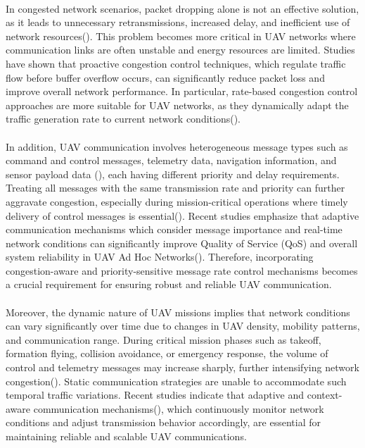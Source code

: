 \documentclass[pdflatex,sn-mathphys-num]{sn-jnl}%
\theoremstyle{thmstyleone}%
\theoremstyle{thmstyletwo}%
\theoremstyle{thmstylethree}%
\begin{document}
\\
In congested network scenarios, packet dropping alone is not an effective solution, as it leads to unnecessary retransmissions, increased delay, and inefficient use of network resources(\citet{anwekar2023analysis}). This problem becomes more critical in UAV networks where communication links are often unstable and energy resources are limited. Studies have shown that proactive congestion control techniques, which regulate traffic flow before buffer overflow occurs, can significantly reduce packet loss and improve overall network performance. In particular, rate-based congestion control approaches are more suitable for UAV networks, as they dynamically adapt the traffic generation rate to current network conditions(\citet{verma2024adaptive}).\\
\\
 In addition, UAV communication involves heterogeneous message types such as command and control messages, telemetry data, navigation information, and sensor payload data (\citet{cordill2025comprehensive}), each having different priority and delay requirements. Treating all messages with the same transmission rate and priority can further aggravate congestion, especially during mission-critical operations where timely delivery of control messages is essential(\citet{ribeiro2021communication}). Recent studies emphasize that adaptive communication mechanisms which consider message importance and real-time network conditions can significantly improve Quality of Service (QoS) and overall system reliability in UAV Ad Hoc Networks(\citet{buenrostro2023prioritization}). Therefore, incorporating congestion-aware and priority-sensitive message rate control mechanisms becomes a crucial requirement for ensuring robust and reliable UAV communication.\\
 \\
 Moreover, the dynamic nature of UAV missions implies that network conditions can vary significantly over time due to changes in UAV density, mobility patterns, and communication range. During critical mission phases such as takeoff, formation flying, collision avoidance, or emergency response, the volume of control and telemetry messages may increase sharply, further intensifying network congestion(\citet{mohsan2023unmanned}). Static communication strategies are unable to accommodate such temporal traffic variations. Recent studies indicate that adaptive and context-aware communication mechanisms(\citet{rovira2022review}), which continuously monitor network conditions and adjust transmission behavior accordingly, are essential for maintaining reliable and scalable UAV communications.\\
 
\end{document}
